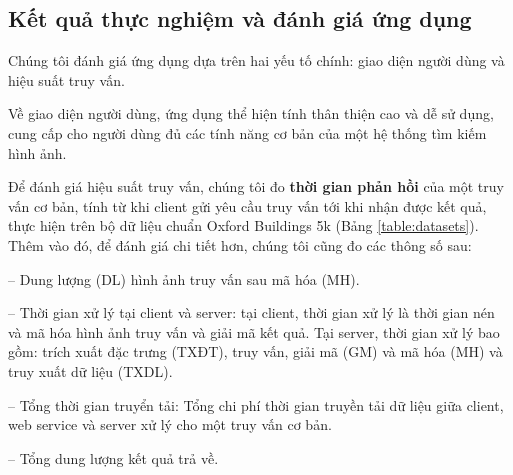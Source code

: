 	\subsection{Kết quả thực nghiệm và đánh giá ứng dụng}
	Chúng tôi đánh giá ứng dụng dựa trên hai yếu tố chính: giao diện người dùng và hiệu suất truy vấn.
	
	Về giao diện người dùng, ứng dụng thể hiện tính thân thiện cao và dễ sử dụng, cung cấp cho người dùng đủ các tính năng cơ bản của một hệ thống tìm kiếm hình ảnh.
	
	Để đánh giá hiệu suất truy vấn, chúng tôi đo \textbf{thời gian phản hồi} của một truy vấn cơ bản, tính từ khi client gửi yêu cầu truy vấn tới khi nhận được kết quả, thực hiện trên bộ dữ liệu chuẩn Oxford Buildings 5k (Bảng \ref{table:datasets}). Thêm vào đó, để đánh giá chi tiết hơn, chúng tôi cũng đo các thông số sau:
	
	-- Dung lượng (DL) hình ảnh truy vấn sau mã hóa (MH).
	
	-- Thời gian xử lý tại client và server: tại client, thời gian xử lý là thời gian nén và mã hóa hình ảnh truy vấn và giải mã kết quả. Tại server, thời gian xử lý bao gồm: trích xuất đặc trưng (TXĐT), truy vấn, giải mã (GM) và mã hóa (MH) và truy xuất dữ liệu (TXDL).
	
	-- Tổng thời gian truyển tải: Tổng chi phí thời gian truyền tải dữ liệu giữa client, web service và server xử lý cho một truy vấn cơ bản.
	
	-- Tổng dung lượng kết quả trả về.
	
